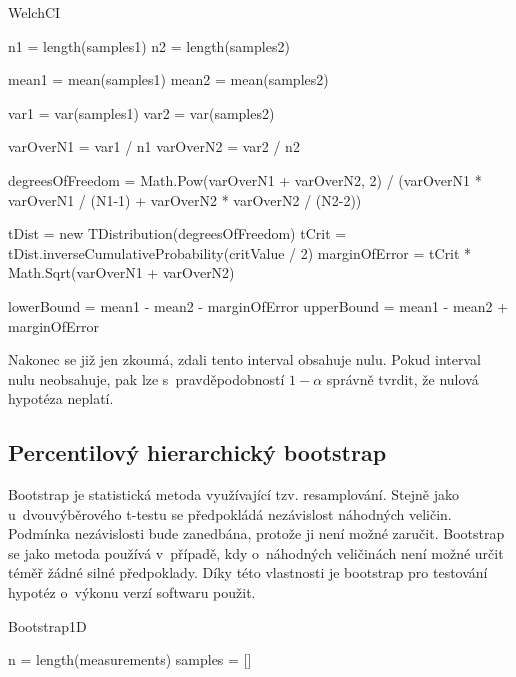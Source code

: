 \begin{algorithm}[!ht]
    \caption{WelchCI}

    n1 = length(samples1)\;
    n2 = length(samples2)\;

    mean1 = mean(samples1)\;
    mean2 = mean(samples2)\;

    var1 = var(samples1)\;
    var2 = var(samples2)\;

    varOverN1 = var1 / n1\;
    varOverN2 = var2 / n2\;

    degreesOfFreedom = Math.Pow(varOverN1 + varOverN2, 2) / (varOverN1 * varOverN1 / (N1-1) + varOverN2 * varOverN2 / (N2-2))\;

    tDist = new TDistribution(degreesOfFreedom)\;
    tCrit = tDist.inverseCumulativeProbability(critValue / 2)\;
    marginOfError = tCrit * Math.Sqrt(varOverN1 + varOverN2)\;

    lowerBound = mean1 - mean2 - marginOfError\;
    upperBound = mean1 - mean2 + marginOfError\;

\end{algorithm}

Nakonec se již jen zkoumá, zdali tento interval obsahuje nulu.
Pokud interval nulu neobsahuje, pak lze s~pravděpodobností $1-\alpha$ správně tvrdit, že
nulová hypotéza neplatí.

\subsection{Percentilový hierarchický bootstrap}


Bootstrap je statistická metoda využívající tzv. resamplování.
Stejně jako u~dvouvýběrového t-testu se předpokládá nezávislost náhodných veličin.
Podmínka nezávislosti bude zanedbána, protože ji není možné zaručit.
Bootstrap se jako metoda používá v~případě, kdy o~náhodných veličinách není možné
určit téměř žádné silné předpoklady. Díky této vlastnosti je bootstrap pro testování
hypotéz o~výkonu verzí softwaru použit.

\begin{algorithm}[!ht]
    \caption{Bootstrap1D}
    
    n = length(measurements)\;
    samples = []\;

    
    \;
\end{algorithm}

